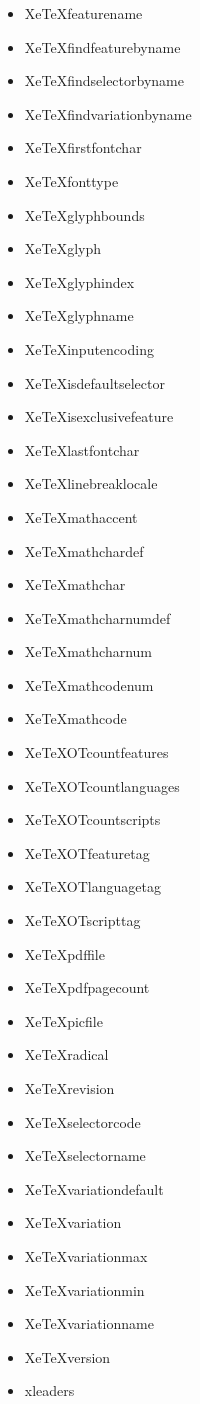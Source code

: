 \begin{itemize}
  \item XeTeXfeaturename
  \item XeTeXfindfeaturebyname
  \item XeTeXfindselectorbyname
  \item XeTeXfindvariationbyname
  \item XeTeXfirstfontchar
  \item XeTeXfonttype
  \item XeTeXglyphbounds
  \item XeTeXglyph
  \item XeTeXglyphindex
  \item XeTeXglyphname
  \item XeTeXinputencoding
  \item XeTeXisdefaultselector
  \item XeTeXisexclusivefeature
  \item XeTeXlastfontchar
  \item XeTeXlinebreaklocale
  \item XeTeXmathaccent
  \item XeTeXmathchardef
  \item XeTeXmathchar
  \item XeTeXmathcharnumdef
  \item XeTeXmathcharnum
  \item XeTeXmathcodenum
  \item XeTeXmathcode
  \item XeTeXOTcountfeatures
  \item XeTeXOTcountlanguages
  \item XeTeXOTcountscripts
  \item XeTeXOTfeaturetag
  \item XeTeXOTlanguagetag
  \item XeTeXOTscripttag
  \item XeTeXpdffile
  \item XeTeXpdfpagecount
  \item XeTeXpicfile
  \item XeTeXradical
  \item XeTeXrevision
  \item XeTeXselectorcode
  \item XeTeXselectorname
  \item XeTeXvariationdefault
  \item XeTeXvariation
  \item XeTeXvariationmax
  \item XeTeXvariationmin
  \item XeTeXvariationname
  \item XeTeXversion
  \item xleaders
\end{itemize}